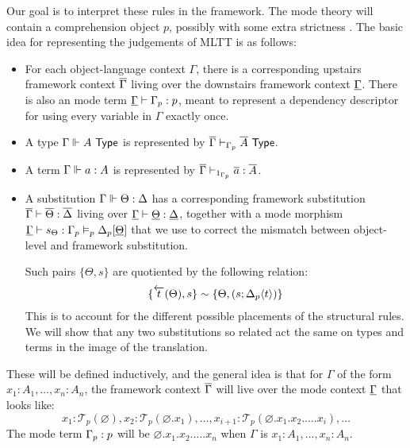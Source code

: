 \documentclass[10pt]{article}
\theoremstyle{definition}
\let\emptyset\varnothing
\newcommand{\yields}{\vdash}
\newcommand{\TYPE}{\,\,\mathsf{Type}}
\newcommand{\rewrite}[2]{\overleftarrow{#1}(#2)}
\newcommand\El[2]{\mathcal{T}_{#1}(#2)}
\newcommand\ap[2]{\ensuremath{#1 \langle #2 \rangle }}
\begin{document}
Our goal is to interpret these rules in the framework. The mode theory will contain a comprehension object $p$, possibly with some extra strictness . The basic idea for representing the judgements of MLTT is as follows:
\begin{itemize}
\item For each object-language context $\Gamma$, there is a corresponding upstairs framework context $\overline{\Gamma}$ living over the downstairs framework context $\underline{\Gamma}$. There is also an mode term $\downstairs{\Gamma} \yields \asdep{\Gamma} : p$, meant to represent a dependency descriptor for using every variable in $\Gamma$ exactly once.

\item A type $\Gamma \qyields A \TYPE$ is represented by $\upstairs{\Gamma} \yields_{\asdep{\Gamma}} \upstairs{A} \TYPE$.
  
\item A term $\Gamma \Vdash a : A$ is represented by $\upstairs{\Gamma} \yields_{1_{\asdep{\Gamma}}} \upstairs{a} : \upstairs{A}$.

\item A substitution $\Gamma \Vdash \Theta : \Delta$ has a corresponding framework substitution $\upstairs{\Gamma} \yields \upstairs{\Theta} : \upstairs{\Delta}$ living over $\downstairs{\Gamma} \yields \downstairs{\Theta} : \downstairs{\Delta}$, together with a mode morphism $\downstairs{\Gamma} \yields s_\Theta : \asdep{\Gamma} \vDash_p \asdep{\Delta}[\downstairs{\Theta}]$ that we use to correct the mismatch between object-level and framework substitution.

Such pairs $\{ \Theta, s \}$ are quotiented by the following relation:
\begin{align*}
\{ \rewrite{t}{\Theta}, s \} \sim \{ \Theta, (s ; \ap{\asdep{\Delta}}{t})\}
\end{align*}
This is to account for the different possible placements of the structural rules. We will show that any two substitutions so related act the same on types and terms in the image of the translation.
\end{itemize}

These will be defined inductively, and the general idea is that for $\Gamma$ of the form $x_1 : A_1, \ldots , x_n : A_n$, the framework context $\overline{\Gamma}$ will live over the mode context $\underline{\Gamma}$ that looks like:
  \[x_1 : \El{p}{\emptyset}, x_2 : \El{p}{\emptyset.x_1}, \ldots, x_{i+1} : \El{p}{\emptyset.x_1.x_2.\ldots.x_i},\ldots
  \]
  The mode term ${\Gamma}_p : p$ will be $\emptyset.x_1.x_2.\ldots.x_n$ when $\Gamma$ is $x_1 : A_1, \ldots , x_n : A_n$.
\end{document}
